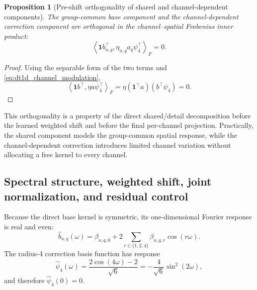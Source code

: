 \documentclass[pdflatex,sn-mathphys-num]{sn-jnl}
\theoremstyle{thmstyleone}
\newtheorem{proposition}[theorem]{Proposition}
\theoremstyle{thmstyletwo}
\theoremstyle{thmstylethree}
\begin{document}
\begin{proposition}[Pre-shift orthogonality of shared and channel-dependent components]
\label{prop:dt1d_orthogonality}
The group-common base component and the channel-dependent correction component are orthogonal in the channel--spatial Frobenius inner product:
\begin{equation}
\left\langle
\mathbf{1}b_{u,q}^{\top},
\eta_{u,q}a_q\psi_4^{\top}
\right\rangle_F
=0.
\end{equation}
\end{proposition}

\begin{proof}
Using the separable form of the two terms and \eqref{eq:dt1d_channel_modulation},
\[
\left\langle
\mathbf{1}b^{\top},
\eta a\psi_4^{\top}
\right\rangle_F
=
\eta(\mathbf{1}^{\top}a)(b^{\top}\psi_4)
=0.
\]
\end{proof}

This orthogonality is a property of the direct shared/detail decomposition before the learned weighted shift and before the final per-channel projection. Practically, the shared component models the group-common spatial response, while the channel-dependent correction introduces limited channel variation without allocating a free kernel to every channel.

\subsection{Spectral structure, weighted shift, joint normalization, and residual control}
\label{subsec:spectral_stability}

Because the direct base kernel is symmetric, its one-dimensional Fourier response is real and even:
\begin{equation}
\widehat{b}_{u,q}(\omega)
=
\beta_{u,q,0}
+
2\sum_{r\in\{1,2,4\}}
\beta_{u,q,r}\cos(r\omega).
\label{eq:dt1d_shared_base_spectrum}
\end{equation}
The radius-4 correction basis function has response
\begin{equation}
\widehat{\psi}_4(\omega)
=
\frac{2\cos(4\omega)-2}{\sqrt{6}}
=
-\frac{4}{\sqrt{6}}\sin^2(2\omega),
\label{eq:dt1d_correction_spectrum}
\end{equation}
and therefore $\widehat{\psi}_4(0)=0$.
\end{document}
